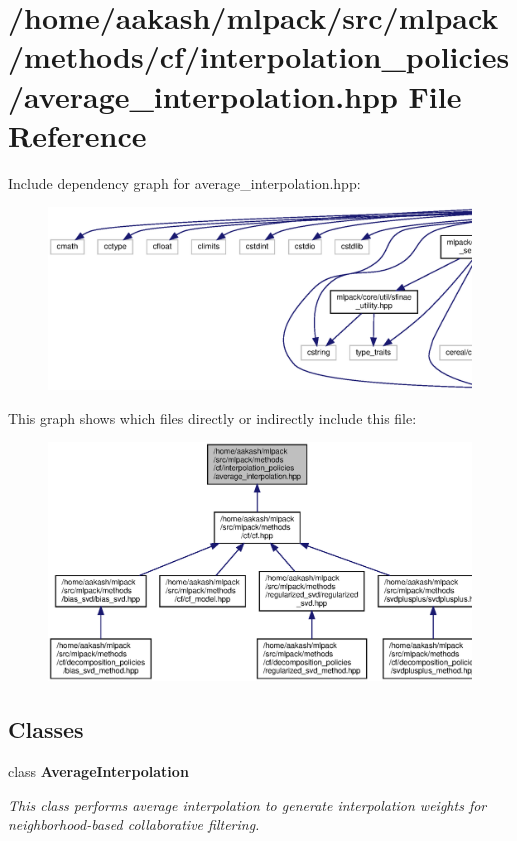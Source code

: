 \section{/home/aakash/mlpack/src/mlpack/methods/cf/interpolation\+\_\+policies/average\+\_\+interpolation.hpp File Reference}
\label{average__interpolation_8hpp}
Include dependency graph for average\+\_\+interpolation.\+hpp\+:
\nopagebreak
\begin{figure}[H]
\begin{center}
\leavevmode
\includegraphics[width=350pt]{average__interpolation_8hpp__incl}
\end{center}
\end{figure}
This graph shows which files directly or indirectly include this file\+:
\nopagebreak
\begin{figure}[H]
\begin{center}
\leavevmode
\includegraphics[width=350pt]{average__interpolation_8hpp__dep__incl}
\end{center}
\end{figure}
\subsection*{Classes}
\begin{DoxyCompactItemize}
\item 
class \textbf{ Average\+Interpolation}
\begin{DoxyCompactList}\small\item\em This class performs average interpolation to generate interpolation weights for neighborhood-\/based collaborative filtering. \end{DoxyCompactList}\end{DoxyCompactItemize}
